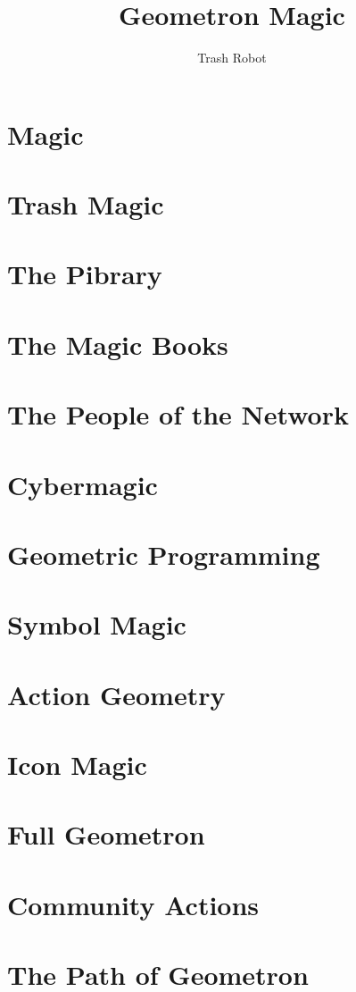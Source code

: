 \documentclass{report}
\title{Geometron Magic}
\author{Trash Robot}
\begin{document}
\clearpage

\clearpage

\newpage
\thispagestyle{empty}
\mbox{}

\maketitle

\tableofcontents

\listoffigures 

%


\chapter{Magic}

\chapter{Trash Magic}

\chapter{The Pibrary}

\chapter{The Magic Books}

\chapter{The People of the Network}

\chapter{Cybermagic}

\chapter{Geometric Programming}

\chapter{Symbol Magic}

\chapter{Action Geometry}

\chapter{Icon Magic}

\chapter{Full Geometron}

\chapter{Community Actions}

\chapter{The Path of Geometron}



\end{document}
